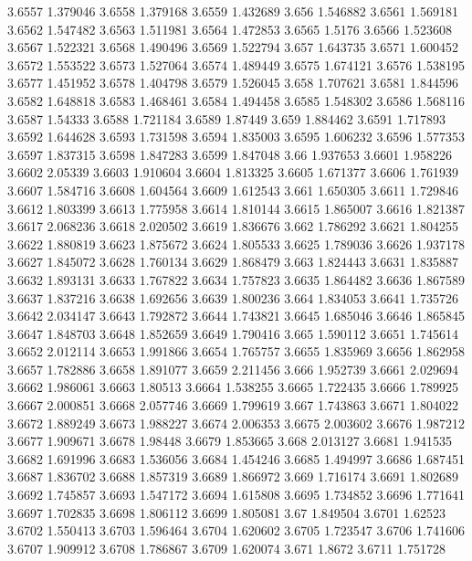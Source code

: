 3.6557  1.379046
3.6558  1.379168
3.6559  1.432689
3.656  1.546882
3.6561  1.569181
3.6562  1.547482
3.6563  1.511981
3.6564  1.472853
3.6565  1.5176
3.6566  1.523608
3.6567  1.522321
3.6568  1.490496
3.6569  1.522794
3.657  1.643735
3.6571  1.600452
3.6572  1.553522
3.6573  1.527064
3.6574  1.489449
3.6575  1.674121
3.6576  1.538195
3.6577  1.451952
3.6578  1.404798
3.6579  1.526045
3.658  1.707621
3.6581  1.844596
3.6582  1.648818
3.6583  1.468461
3.6584  1.494458
3.6585  1.548302
3.6586  1.568116
3.6587  1.54333
3.6588  1.721184
3.6589  1.87449
3.659  1.884462
3.6591  1.717893
3.6592  1.644628
3.6593  1.731598
3.6594  1.835003
3.6595  1.606232
3.6596  1.577353
3.6597  1.837315
3.6598  1.847283
3.6599  1.847048
3.66  1.937653
3.6601  1.958226
3.6602  2.05339
3.6603  1.910604
3.6604  1.813325
3.6605  1.671377
3.6606  1.761939
3.6607  1.584716
3.6608  1.604564
3.6609  1.612543
3.661  1.650305
3.6611  1.729846
3.6612  1.803399
3.6613  1.775958
3.6614  1.810144
3.6615  1.865007
3.6616  1.821387
3.6617  2.068236
3.6618  2.020502
3.6619  1.836676
3.662  1.786292
3.6621  1.804255
3.6622  1.880819
3.6623  1.875672
3.6624  1.805533
3.6625  1.789036
3.6626  1.937178
3.6627  1.845072
3.6628  1.760134
3.6629  1.868479
3.663  1.824443
3.6631  1.835887
3.6632  1.893131
3.6633  1.767822
3.6634  1.757823
3.6635  1.864482
3.6636  1.867589
3.6637  1.837216
3.6638  1.692656
3.6639  1.800236
3.664  1.834053
3.6641  1.735726
3.6642  2.034147
3.6643  1.792872
3.6644  1.743821
3.6645  1.685046
3.6646  1.865845
3.6647  1.848703
3.6648  1.852659
3.6649  1.790416
3.665  1.590112
3.6651  1.745614
3.6652  2.012114
3.6653  1.991866
3.6654  1.765757
3.6655  1.835969
3.6656  1.862958
3.6657  1.782886
3.6658  1.891077
3.6659  2.211456
3.666  1.952739
3.6661  2.029694
3.6662  1.986061
3.6663  1.80513
3.6664  1.538255
3.6665  1.722435
3.6666  1.789925
3.6667  2.000851
3.6668  2.057746
3.6669  1.799619
3.667  1.743863
3.6671  1.804022
3.6672  1.889249
3.6673  1.988227
3.6674  2.006353
3.6675  2.003602
3.6676  1.987212
3.6677  1.909671
3.6678  1.98448
3.6679  1.853665
3.668  2.013127
3.6681  1.941535
3.6682  1.691996
3.6683  1.536056
3.6684  1.454246
3.6685  1.494997
3.6686  1.687451
3.6687  1.836702
3.6688  1.857319
3.6689  1.866972
3.669  1.716174
3.6691  1.802689
3.6692  1.745857
3.6693  1.547172
3.6694  1.615808
3.6695  1.734852
3.6696  1.771641
3.6697  1.702835
3.6698  1.806112
3.6699  1.805081
3.67  1.849504
3.6701  1.62523
3.6702  1.550413
3.6703  1.596464
3.6704  1.620602
3.6705  1.723547
3.6706  1.741606
3.6707  1.909912
3.6708  1.786867
3.6709  1.620074
3.671  1.8672
3.6711  1.751728

